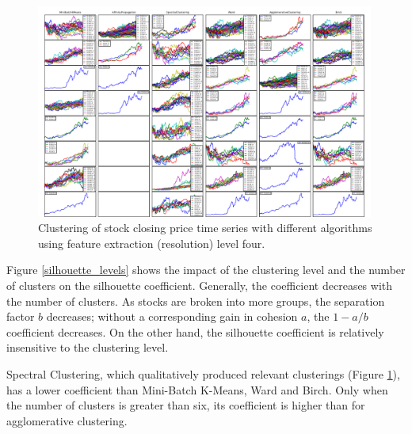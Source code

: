 \documentclass{article}
\begin{document}
\begin{figure}
\includegraphics[width=0.99\textwidth]{../demo/CompleteGrid.pdf}
\caption{Clustering of stock closing price time series with different algorithms
using feature extraction (resolution) level four.}
\label{ClusterTimeSeries}
\end{figure}

Figure \ref{silhouette_levels} shows the impact of the clustering level and the number of clusters on the silhouette coefficient. Generally, the coefficient decreases with the number of clusters. As stocks are broken into more groups, the separation factor $b$ decreases; without a corresponding gain in cohesion $a$, the $1-a/b$ coefficient decreases. On the other hand, the silhouette coefficient is relatively insensitive to the clustering level.

Spectral Clustering, which qualitatively produced relevant clusterings (Figure \ref{ClusterTimeSeries}), has a lower coefficient than Mini-Batch K-Means, Ward and Birch. Only when the number of clusters is greater than six, its coefficient is higher than for agglomerative clustering.
\end{document}
